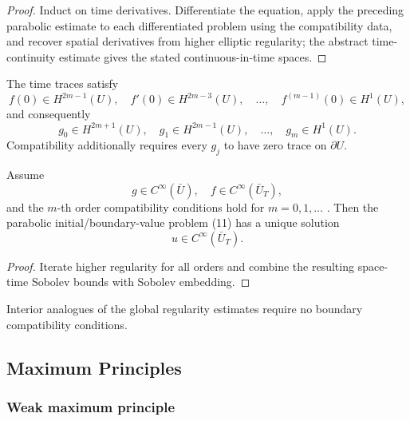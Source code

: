 \begin{proof}
\sketch Induct on time derivatives. Differentiate the equation, apply the preceding parabolic estimate to each differentiated problem using the compatibility data, and recover spatial derivatives from higher elliptic regularity; the abstract time-continuity estimate gives the stated continuous-in-time spaces.
\end{proof}

\begin{remark}
\label{rem:parabolic-compatibility-conditions}
The time traces satisfy
\[
f(0)\in H^{2m-1}(U),\quad f'(0)\in H^{2m-3}(U),\quad\ldots,\quad f^{(m-1)}(0)\in H^1(U),
\]
and consequently
\[
g_0\in H^{2m+1}(U),\quad g_1\in H^{2m-1}(U),\quad\ldots,\quad g_m\in H^1(U).
\]
Compatibility additionally requires every $g_j$ to have zero trace on $\partial U$.
\end{remark}

\begin{theorem}
\label{thm:parabolic-infinite-differentiability}
Assume
\[
g \in C^\infty(\bar{U}), \quad f \in C^\infty(\bar{U}_T),
\]
and the $m$-th order compatibility conditions hold for $m = 0, 1, \ldots$ . Then the parabolic initial/boundary-value problem (11) has a unique solution
\[
u \in C^\infty(\bar{U}_T).
\]
\end{theorem}

\begin{proof}
\sketch Iterate higher regularity for all orders and combine the resulting space-time Sobolev bounds with Sobolev embedding.
\end{proof}

\begin{remark}
\label{rem:parabolic-interior-estimates}
Interior analogues of the global regularity estimates require no boundary compatibility conditions.
\end{remark}

\subsection{Maximum Principles}

\subsubsection{Weak maximum principle}

